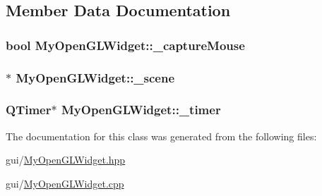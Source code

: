 \subsection{Member Data Documentation}
\hypertarget{class_my_open_g_l_widget_af001d889fec5469aa3e67c11ae48b29d}{
\subsubsection[{\+\_\+capture\+Mouse}]{\setlength{\rightskip}{0pt plus 5cm}bool My\+Open\+G\+L\+Widget\+::\+\_\+capture\+Mouse\hspace{0.3cm}{\ttfamily [private]}}}\label{class_my_open_g_l_widget_af001d889fec5469aa3e67c11ae48b29d}
\hypertarget{class_my_open_g_l_widget_a26a1f259357dd7c8822d715d81591395}{
\subsubsection[{\+\_\+scene}]{$\ast$ My\+Open\+G\+L\+Widget\+::\+\_\+scene\hspace{0.3cm}{\ttfamily [private]}}}\label{class_my_open_g_l_widget_a26a1f259357dd7c8822d715d81591395}
\hypertarget{class_my_open_g_l_widget_aa6ba509f0ef6e8c2d266b83e1d380eb8}{
\subsubsection[{\+\_\+timer}]{\setlength{\rightskip}{0pt plus 5cm}Q\+Timer$\ast$ My\+Open\+G\+L\+Widget\+::\+\_\+timer\hspace{0.3cm}{\ttfamily [private]}}}\label{class_my_open_g_l_widget_aa6ba509f0ef6e8c2d266b83e1d380eb8}


The documentation for this class was generated from the following files\+:\begin{DoxyCompactItemize}
\item 
gui/\hyperlink{_my_open_g_l_widget_8hpp}{My\+Open\+G\+L\+Widget.\+hpp}\item 
gui/\hyperlink{_my_open_g_l_widget_8cpp}{My\+Open\+G\+L\+Widget.\+cpp}\end{DoxyCompactItemize}
